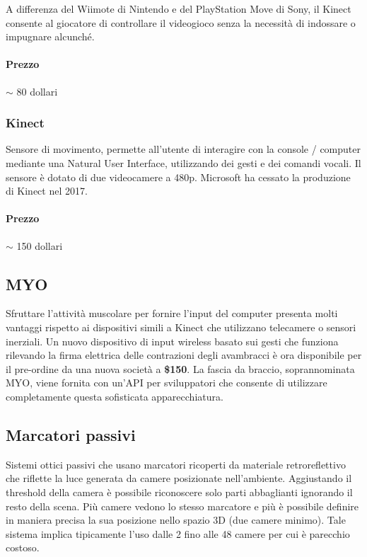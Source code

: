 \documentclass[8pt]{extarticle}
\begin{document}
\begin{multicols}{3}
A differenza del Wiimote di Nintendo e del PlayStation Move di Sony, il Kinect consente al giocatore di controllare
il videogioco senza la necessità di indossare o impugnare alcunché.

\paragraph{Prezzo} $\sim$ 80 dollari


\subsubsection{Kinect}
Sensore di movimento, permette all'utente di interagire con la console / computer mediante una Natural User Interface,
utilizzando dei gesti e dei comandi vocali.
Il sensore è dotato di due videocamere a 480p.
Microsoft ha cessato la produzione di Kinect nel 2017.

\paragraph{Prezzo} $\sim$ 150 dollari

\subsection{MYO}
Sfruttare l'attività muscolare per fornire l'input del computer presenta molti vantaggi rispetto ai dispositivi simili a Kinect che utilizzano telecamere o sensori inerziali. Un nuovo dispositivo di input wireless basato sui gesti che funziona rilevando la firma elettrica delle contrazioni degli avambracci è ora disponibile per il pre-ordine da una nuova società a \textbf{\$150}. La fascia da braccio, soprannominata MYO, viene fornita con un'API per sviluppatori che consente di utilizzare completamente questa sofisticata apparecchiatura.
\subsection{Marcatori passivi}
Sistemi ottici passivi che usano marcatori ricoperti da materiale retroreflettivo che riflette la luce generata da camere posizionate nell'ambiente.
Aggiustando il threshold della camera è possibile riconoscere solo parti abbaglianti ignorando il resto della scena.
Più camere vedono lo stesso marcatore e più è possibile definire in maniera precisa la sua posizione nello spazio 3D (due camere minimo).
Tale sistema implica tipicamente l'uso dalle 2 fino alle 48 camere per cui è parecchio costoso.

\end{multicols}
\end{document}
